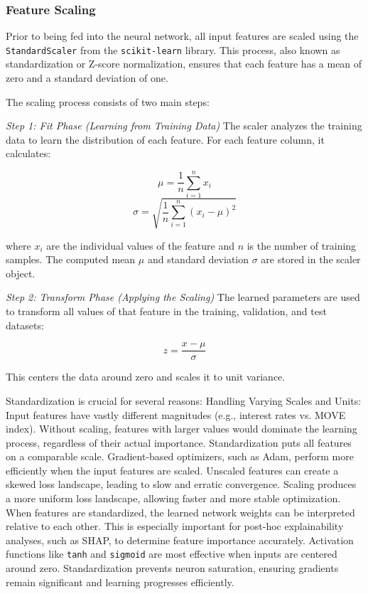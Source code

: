 {\subsubsection{Feature Scaling}
Prior to being fed into the neural network, all input features are scaled using the \texttt{StandardScaler} from the \texttt{scikit-learn} library. This process, also known as standardization or Z-score normalization, ensures that each feature has a mean of zero and a standard deviation of one.

The scaling process consists of two main steps:

\textit{Step 1: Fit Phase (Learning from Training Data)}
The scaler analyzes the training data to learn the distribution of each feature. For each feature column, it calculates:

\begin{equation}
	\mu = \frac{1}{n} \sum_{i=1}^{n} x_i
\end{equation}
\begin{equation}
	\sigma = \sqrt{\frac{1}{n} \sum_{i=1}^{n} (x_i - \mu)^2}
\end{equation}

where \(x_i\) are the individual values of the feature and \(n\) is the number of training samples. The computed mean \(\mu\) and standard deviation \(\sigma\) are stored in the scaler object.

\textit{Step 2: Transform Phase (Applying the Scaling)}
The learned parameters are used to transform all values of that feature in the training, validation, and test datasets:

\begin{equation}
	z = \frac{x - \mu}{\sigma}
\end{equation}

This centers the data around zero and scales it to unit variance.

Standardization is crucial for several reasons:
Handling Varying Scales and Units: Input features have vastly different magnitudes (e.g., interest rates vs. MOVE index). Without scaling, features with larger values would dominate the learning process, regardless of their actual importance. Standardization puts all features on a comparable scale.
Gradient-based optimizers, such as Adam, perform more efficiently when the input features are scaled. Unscaled features can create a skewed loss landscape, leading to slow and erratic convergence. Scaling produces a more uniform loss landscape, allowing faster and more stable optimization.
When features are standardized, the learned network weights can be interpreted relative to each other. This is especially important for post-hoc explainability analyses, such as SHAP, to determine feature importance accurately.
Activation functions like \texttt{tanh} and \texttt{sigmoid} are most effective when inputs are centered around zero. Standardization prevents neuron saturation, ensuring gradients remain significant and learning progresses efficiently.

}
